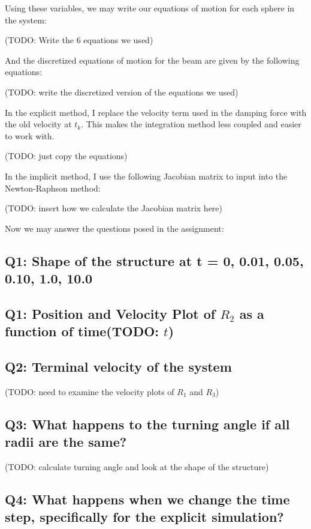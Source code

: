 \documentclass[letterpaper, 10 pt, conference]{ieeeconf}  %
\begin{document}
Using these variables, we may write our equations of motion for each sphere in the system:

(TODO: Write the 6 equations we used)

And the discretized equations of motion for the beam are given by the following equations:

(TODO: write the discretized version of the equations we used)

In the explicit method, I replace the velocity term used in the damping force with the old velocity at $t_k$. This makes the integration method less coupled and easier to work with.

(TODO: just copy the equations)

In the implicit method, I use the following Jacobian matrix to input into the Newton-Raphson method:

(TODO: insert how we calculate the Jacobian matrix here)

Now we may answer the questions posed in the assignment:

\subsection{Q1: Shape of the structure at t = {0, 0.01, 0.05, 0.10, 1.0, 10.0}}

\subsection{Q1: Position and Velocity Plot of $R_2$  as a function of time(TODO: $t$)}

\subsection{ Q2: Terminal velocity of the system}

(TODO: need to examine the velocity plots of $R_1$ and $R_3$)

\subsection{ Q3: What happens to the turning angle if all radii are the same? }

(TODO: calculate turning angle and look at the shape of the structure)

\subsection{ Q4: What happens when we change the time step, specifically for the explicit simulation?}
\end{document}
